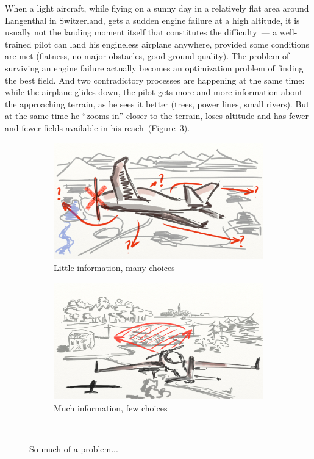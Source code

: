 When a light aircraft, while flying on a sunny day in a relatively flat area
around Langenthal in Switzerland, gets a sudden engine failure at a high
altitude, it is usually not the landing moment itself that constitutes the
difficulty~--- a well-trained pilot can land his engineless airplane anywhere,
provided some conditions are met (flatness, no major obstacles, good ground
quality). The problem of surviving an engine failure actually becomes an
optimization problem of finding the best field. And two contradictory processes
are happening at the same time: while the airplane glides down, the pilot gets
more and more information about the approaching terrain, as he sees it better
(trees, power lines, small rivers). But at the same time he ``zooms in'' closer
to the terrain, loses altitude and has fewer and fewer fields available in his
reach~(Figure~\ref{fig:airplane}).
\begin{figure}[bh!]
    \centering
    \begin{subfigure}[b]{.49\textwidth}
        \includegraphics[width=\linewidth]{figures/ch_introduction/airplane-1}
        \caption{Little information, many choices}
        \label{fig:airplane-1}
    \end{subfigure}
    \hfill
    \begin{subfigure}[b]{.49\textwidth}            
        \includegraphics[width=\linewidth]{figures/ch_introduction/airplane-2}
        \caption{Much information, few choices}
        \label{fig:airplane-2}
    \end{subfigure}
    \\[.5cm]
    \caption{So much of a problem...}
    \label{fig:airplane}
\end{figure}

